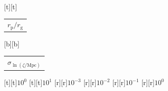 %    
%
%
\begin{psfrags}%
\psfragscanon%
%
[t][t]{\color[rgb]{0,0,0}\setlength{\tabcolsep}{0pt}\begin{tabular}{c}{\Large$r_\mathrm{p}/r_\mathrm{g}$}\end{tabular}}%
[b][b]{\color[rgb]{0,0,0}\setlength{\tabcolsep}{0pt}\begin{tabular}{c}{\Large$\sigma_{\ln(\zeta/\mathrm{Mpc})}$}\end{tabular}}%
%
[t][t]{$10^{0}$}%
[t][t]{$10^{1}$}%
%
[r][r]{$10^{-3}$}%
[r][r]{$10^{-2}$}%
[r][r]{$10^{-1}$}%
[r][r]{$10^{0}$}%
%
%
\end{psfrags}%
%
